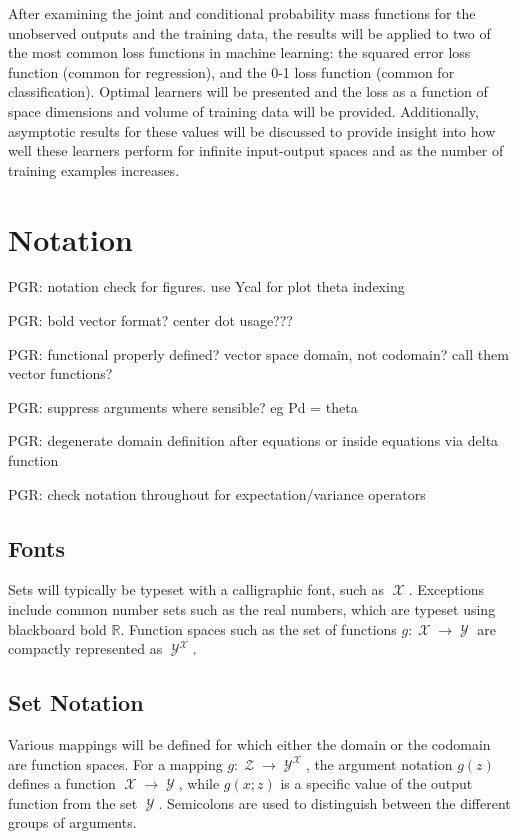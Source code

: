 \documentclass[12pt]{report}
\DeclareMathOperator{\Xcal}{\mathcal{X}}
\DeclareMathOperator{\Ycal}{\mathcal{Y}}
\DeclareMathOperator{\Zcal}{\mathcal{Z}}
\begin{document}
After examining the joint and conditional probability mass functions for the unobserved outputs and the training data, the results will be applied to two of the most common loss functions in machine learning: the squared error loss function (common for regression), and the 0-1 loss function (common for classification). Optimal learners will be presented and the loss as a function of space dimensions and volume of training data will be provided. Additionally, asymptotic results for these values will be discussed to provide insight into how well these learners perform for infinite input-output spaces and as the number of training examples increases. 


\section{Notation}

PGR: notation check for figures. use Ycal for plot theta indexing

PGR: bold vector format? center dot usage???

PGR: functional properly defined? vector space domain, not codomain? call them vector functions?

PGR: suppress arguments where sensible? eg Pd = theta

PGR: degenerate domain definition after equations or inside equations via delta function

PGR: check notation throughout for expectation/variance operators



\subsection{Fonts}

Sets will typically be typeset with a calligraphic font, such as $\Xcal$. Exceptions include common number sets such as the real numbers, which are typeset using blackboard bold $\mathbb{R}$. Function spaces such as the set of functions $g : \Xcal \to \Ycal$ are compactly represented as $\Ycal^{\Xcal}$.


\subsection{Set Notation}

Various mappings will be defined for which either the domain or the codomain are function spaces. For a mapping $g : \Zcal \to \Ycal^{\Xcal}$, the argument notation $g(z)$ defines a function $\Xcal \to \Ycal$, while $g(x;z)$ is a specific value of the output function from the set $\Ycal$. Semicolons are used to distinguish between the different groups of arguments.
\end{document}
